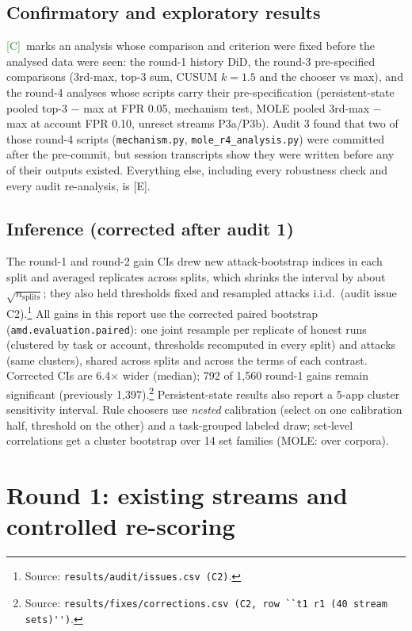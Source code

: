 \documentclass[11pt]{article}
\newcommand{\src}[1]{\footnote{Source: \nolinkurl{#1}.}}
\newcommand{\tC}{\textsf{\scriptsize\textcolor{ForestGreen}{[C]}}\xspace}
\newcommand{\tE}{\textsf{\scriptsize\textcolor{ink2}{[E]}}\xspace}
\begin{document}
\subsection{Confirmatory and exploratory results}
\tC\ marks an analysis whose comparison and criterion were fixed before the analysed data were seen: the round-1 history DiD, the round-3 pre-specified comparisons (3rd-max, top-3 sum, CUSUM $k{=}1.5$ and the chooser vs max), and the round-4 analyses whose scripts carry their pre-specification (persistent-state pooled top-3 $-$ max at FPR 0.05, mechanism test, MOLE pooled 3rd-max $-$ max at account FPR 0.10, unreset streams P3a/P3b). Audit 3 found that two of those round-4 scripts (\texttt{mechanism.py}, \texttt{mole\_r4\_analysis.py}) were committed after the pre-commit, but session transcripts show they were written before any of their outputs existed. Everything else, including every robustness check and every audit re-analysis, is \tE.

\subsection{Inference (corrected after audit 1)}\label{sec:inference}
The round-1 and round-2 gain CIs drew new attack-bootstrap indices in each split and averaged replicates across splits, which shrinks the interval by about $\sqrt{n_\text{splits}}$; they also held thresholds fixed and resampled attacks i.i.d.\ (audit issue C2).\src{results/audit/issues.csv (C2)} All gains in this report use the corrected paired bootstrap (\texttt{amd.evaluation.paired}): one joint resample per replicate of honest runs (clustered by task or account, thresholds recomputed in every split) and attacks (same clusters), shared across splits and across the terms of each contrast. Corrected CIs are 6.4$\times$ wider (median); 792 of 1{,}560 round-1 gains remain significant (previously 1{,}397).\src{results/fixes/corrections.csv (C2, row ``t1 r1 (40 stream sets)'')} Persistent-state results also report a 5-app cluster sensitivity interval. Rule choosers use \emph{nested} calibration (select on one calibration half, threshold on the other) and a task-grouped labeled draw; set-level correlations get a cluster bootstrap over 14 set families (MOLE: over corpora).

\section{Round 1: existing streams and controlled re-scoring}
\end{document}
